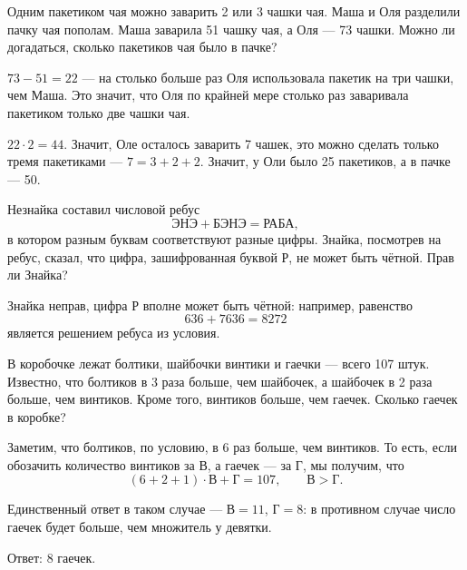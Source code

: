 \begin{itemize}

	\itA Одним пакетиком чая можно заварить 2 или 3 чашки чая. Маша и Оля разделили пачку чая пополам. Маша заварила 51 чашку чая, а Оля — 73 чашки. Можно ли догадаться, сколько пакетиков чая было в пачке?
	
	\itr $73-51 = 22$ — на столько больше раз Оля использовала пакетик на три чашки, чем Маша. Это значит, что Оля по крайней мере столько раз заваривала пакетиком только две чашки чая.
	
	$22 \cdot 2 = 44$. Значит, Оле осталось заварить 7 чашек, это можно сделать только тремя пакетиками — $7=3+2+2$. Значит, у Оли было 25 пакетиков, а в пачке — 50.
	
	\itB Незнайка составил числовой ребус
	$$\text{ЭНЭ}+\text{БЭНЭ}=\text{РАБА},$$
	в котором разным буквам соответствуют разные цифры. Знайка, посмотрев на ребус, сказал, что цифра, зашифрованная буквой Р, не может быть чётной. Прав ли Знайка?
	
	\itr Знайка неправ, цифра Р вполне может быть чётной: например, равенство
	$$636+7636=8272$$
	является решением ребуса из условия.
	
	\itC В коробочке лежат болтики, шайбочки винтики и гаечки — всего 107 штук. Известно, что болтиков в 3 раза больше, чем шайбочек, а шайбочек в 2 раза больше, чем винтиков. Кроме того, винтиков больше, чем гаечек. Сколько гаечек в коробке?
	
	\itr Заметим, что болтиков, по условию, в 6 раз больше, чем винтиков. То есть, если обозачить количество винтиков за В, а гаечек — за Г, мы получим, что
	$$(6+2+1) \cdot \text{В} + \text{Г} = 107,\qquad \text{В} > \text{Г}.$$
	
	Единственный ответ в таком случае — $\text{В} = 11$, $\text{Г} = 8$: в противном случае число гаечек будет больше, чем множитель у девятки.
	
	Ответ: 8 гаечек.

\end{itemize}
